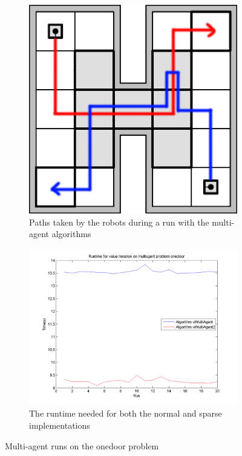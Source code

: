 \documentclass[10pt,a4paper]{article}
\begin{document}
\begin{figure}
        \centering
        \begin{subfigure}{0.4\textwidth}
                \includegraphics[width=\textwidth]{todo/onedoor/path-multi.png}
                \caption{Paths taken by the robots during a run with the multi-agent algorithms}
                \label{fig:multi_onedoor_part1}
                \hspace{10pt}
        \end{subfigure}
        \quad
        \begin{subfigure}{0.48\textwidth}
        		\includegraphics[width=\textwidth]{todo/onedoor/timings_vi.png}
                \caption{The runtime needed for both the normal and sparse implementations}
                \label{fig:multi_onedoor_part2}
                \hspace{-10pt}
        \end{subfigure}
        \caption{Multi-agent runs on the onedoor problem}
        \label{fig:multi_onedoor}
\end{figure}
\end{document}
